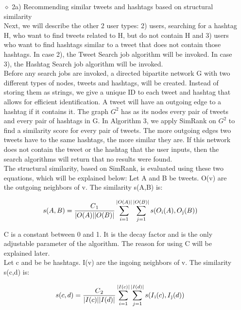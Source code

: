 \documentclass[10pt]{article}
\begin{document}
\begin{itemize}
\begin{itemize}
\item[$\diamond$]{2a) Recommending similar tweets and hashtags based on structural similarity}\\

Next, we will describe the other 2 user types: 2) users, searching for a hashtag H, who want to find tweets related to H, but do not contain H and 3) users who want to find hashtags similar to a tweet that does not contain those hashtags. In case 2), the Tweet Search job algorithm will be invoked. In case 3), the Hashtag Search job algorithm will be invoked. \\

Before any search jobs are invoked, a directed bipartite network G with two different types of nodes, tweets and hashtags, will be created. Instead of storing them as strings, we give a unique ID to each tweet and hashtag that allows for efficient identification. A tweet will have an outgoing edge to a hashtag if it contains it. The graph $ G^2$ has as its nodes every pair of tweets and every pair of hashtags in G. In Algorithm 3, we apply SimRank on $ G^2$  to find a similarity score for every pair of tweets. The more outgoing edges two tweets have to the same hashtags, the more similar they are. If this network does not contain the tweet or the hashtag that the user inputs, then the search algorithms will return that no results were found. \\

The structural similarity, based on SimRank, is evaluated using these two equations, which will be explained below:
Let A and B be tweets. O(v) are the outgoing neighbors of v. The similarity s(A,B) is:

$$s(A,B) = \dfrac{C\textsubscript{1}}{|O(A)||O(B)|} \sum_{i=1}^{|O(A)|} \sum_{j=1}^{|O(B)|} s(O\textsubscript{i}(A),O\textsubscript{j}(B))$$

C is a constant between 0 and 1. It is the decay factor and is the only adjustable parameter of the algorithm. The reason for using C will be explained later. \\

Let c and be be hashtags. I(v) are the ingoing neighbors of v.  The similarity s(c,d) is:

$$s(c,d) = \dfrac{C\textsubscript{2}}{|I(c)||I(d)|} \sum_{i=1}^{|I(c)|} \sum_{j=1}^{|I(d)|} s(I\textsubscript{i}(c),I\textsubscript{j}(d))$$


\end{itemize}
\end{itemize}
\end{document}
